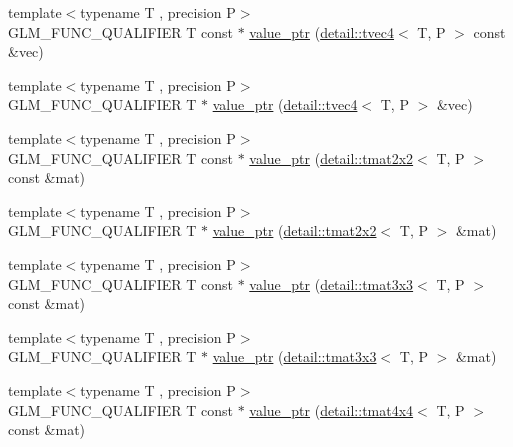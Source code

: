 \begin{DoxyCompactItemize}
{\footnotesize template$<$typename T , precision P$>$ }\\G\+L\+M\+\_\+\+F\+U\+N\+C\+\_\+\+Q\+U\+A\+L\+I\+F\+I\+ER T const $\ast$ \hyperlink{group__gtc__type__ptr_ga6963deec2c77b8a49b3f7e434914f6ba}{value\+\_\+ptr} (\hyperlink{structglm_1_1detail_1_1tvec4}{detail\+::tvec4}$<$ T, P $>$ const \&vec)
\item 
{\footnotesize template$<$typename T , precision P$>$ }\\G\+L\+M\+\_\+\+F\+U\+N\+C\+\_\+\+Q\+U\+A\+L\+I\+F\+I\+ER T $\ast$ \hyperlink{group__gtc__type__ptr_gaa3ed69a05293987972b589311e5feb23}{value\+\_\+ptr} (\hyperlink{structglm_1_1detail_1_1tvec4}{detail\+::tvec4}$<$ T, P $>$ \&vec)
\item 
{\footnotesize template$<$typename T , precision P$>$ }\\G\+L\+M\+\_\+\+F\+U\+N\+C\+\_\+\+Q\+U\+A\+L\+I\+F\+I\+ER T const $\ast$ \hyperlink{group__gtc__type__ptr_ga013fcf415d78cc3aa9273c5d4f780325}{value\+\_\+ptr} (\hyperlink{structglm_1_1detail_1_1tmat2x2}{detail\+::tmat2x2}$<$ T, P $>$ const \&mat)
\item 
{\footnotesize template$<$typename T , precision P$>$ }\\G\+L\+M\+\_\+\+F\+U\+N\+C\+\_\+\+Q\+U\+A\+L\+I\+F\+I\+ER T $\ast$ \hyperlink{group__gtc__type__ptr_ga11e5b6c0d7d5d2627df624bb4b219f20}{value\+\_\+ptr} (\hyperlink{structglm_1_1detail_1_1tmat2x2}{detail\+::tmat2x2}$<$ T, P $>$ \&mat)
\item 
{\footnotesize template$<$typename T , precision P$>$ }\\G\+L\+M\+\_\+\+F\+U\+N\+C\+\_\+\+Q\+U\+A\+L\+I\+F\+I\+ER T const $\ast$ \hyperlink{group__gtc__type__ptr_ga78acb1fd15ce7d1d2861493fac9693ec}{value\+\_\+ptr} (\hyperlink{structglm_1_1detail_1_1tmat3x3}{detail\+::tmat3x3}$<$ T, P $>$ const \&mat)
\item 
{\footnotesize template$<$typename T , precision P$>$ }\\G\+L\+M\+\_\+\+F\+U\+N\+C\+\_\+\+Q\+U\+A\+L\+I\+F\+I\+ER T $\ast$ \hyperlink{group__gtc__type__ptr_gaad64150511d5c6a2d2c7afec724e4064}{value\+\_\+ptr} (\hyperlink{structglm_1_1detail_1_1tmat3x3}{detail\+::tmat3x3}$<$ T, P $>$ \&mat)
\item 
{\footnotesize template$<$typename T , precision P$>$ }\\G\+L\+M\+\_\+\+F\+U\+N\+C\+\_\+\+Q\+U\+A\+L\+I\+F\+I\+ER T const $\ast$ \hyperlink{group__gtc__type__ptr_gaa99522f78635f6949ebf82f065bafa94}{value\+\_\+ptr} (\hyperlink{structglm_1_1detail_1_1tmat4x4}{detail\+::tmat4x4}$<$ T, P $>$ const \&mat)

\end{DoxyCompactItemize}
